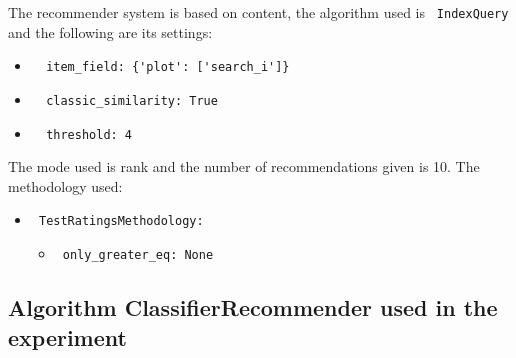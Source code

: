 \documentclass[11pt]{article}
\begin{document}
The recommender system is based on content, the algorithm used
is \verb| IndexQuery | and the following are its settings:
\begin{itemize}
\item \begin{verbatim}
  item_field: {'plot': ['search_i']}
\end{verbatim}
\item \begin{verbatim}
  classic_similarity: True
\end{verbatim}
\item \begin{verbatim}
  threshold: 4
\end{verbatim}
\end{itemize}
\hfill\break
The mode used is rank and the number of recommendations given
is 10.
The methodology used:
\begin{itemize}
    \item \verb| TestRatingsMethodology:|
    \begin{itemize}
                    \item \verb| only_greater_eq: None |
            \end{itemize}
\end{itemize}
\hfill\break






\subsection{Algorithm ClassifierRecommender used in the experiment}\label{subsec:algo_ClassifierRecommender}
\end{document}
